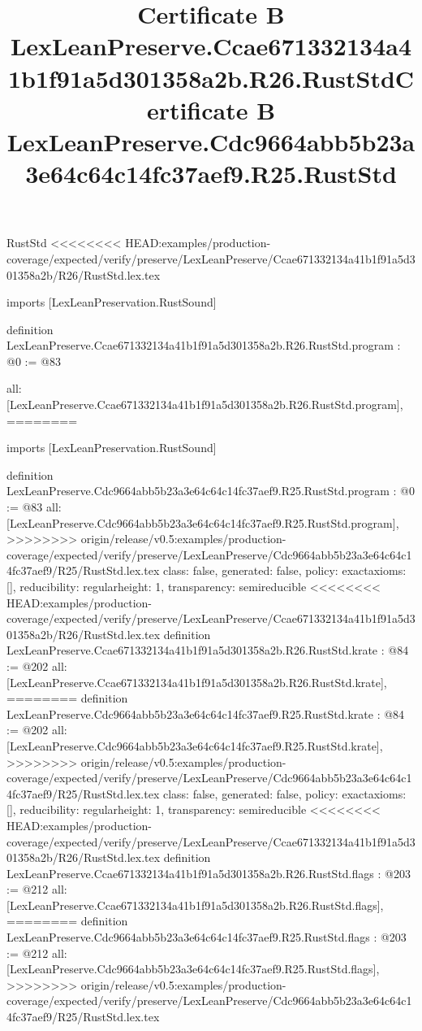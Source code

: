\begin{lexlean}{RustStd}
<<<<<<<< HEAD:examples/production-coverage/expected/verify/preserve/LexLeanPreserve/Ccae671332134a41b1f91a5d301358a2b/R26/RustStd.lex.tex
\title{Certificate B LexLeanPreserve.Ccae671332134a41b1f91a5d301358a2b.R26.RustStd}
\begin{coremodule}
imports [LexLeanPreservation.RustSound]

definition LexLeanPreserve.Ccae671332134a41b1f91a5d301358a2b.R26.RustStd.program : @0 := @83 {
  all: [LexLeanPreserve.Ccae671332134a41b1f91a5d301358a2b.R26.RustStd.program],
========
\title{Certificate B LexLeanPreserve.Cdc9664abb5b23a3e64c64c14fc37aef9.R25.RustStd}
\begin{coremodule}
imports [LexLeanPreservation.RustSound]

definition LexLeanPreserve.Cdc9664abb5b23a3e64c64c14fc37aef9.R25.RustStd.program : @0 := @83 {
  all: [LexLeanPreserve.Cdc9664abb5b23a3e64c64c14fc37aef9.R25.RustStd.program],
>>>>>>>> origin/release/v0.5:examples/production-coverage/expected/verify/preserve/LexLeanPreserve/Cdc9664abb5b23a3e64c64c14fc37aef9/R25/RustStd.lex.tex
  class: false,
  generated: false,
  policy: exact{axioms: []},
  reducibility: regular{height: 1},
  transparency: semireducible
}
<<<<<<<< HEAD:examples/production-coverage/expected/verify/preserve/LexLeanPreserve/Ccae671332134a41b1f91a5d301358a2b/R26/RustStd.lex.tex
definition LexLeanPreserve.Ccae671332134a41b1f91a5d301358a2b.R26.RustStd.krate : @84 := @202 {
  all: [LexLeanPreserve.Ccae671332134a41b1f91a5d301358a2b.R26.RustStd.krate],
========
definition LexLeanPreserve.Cdc9664abb5b23a3e64c64c14fc37aef9.R25.RustStd.krate : @84 := @202 {
  all: [LexLeanPreserve.Cdc9664abb5b23a3e64c64c14fc37aef9.R25.RustStd.krate],
>>>>>>>> origin/release/v0.5:examples/production-coverage/expected/verify/preserve/LexLeanPreserve/Cdc9664abb5b23a3e64c64c14fc37aef9/R25/RustStd.lex.tex
  class: false,
  generated: false,
  policy: exact{axioms: []},
  reducibility: regular{height: 1},
  transparency: semireducible
}
<<<<<<<< HEAD:examples/production-coverage/expected/verify/preserve/LexLeanPreserve/Ccae671332134a41b1f91a5d301358a2b/R26/RustStd.lex.tex
definition LexLeanPreserve.Ccae671332134a41b1f91a5d301358a2b.R26.RustStd.flags : @203 := @212 {
  all: [LexLeanPreserve.Ccae671332134a41b1f91a5d301358a2b.R26.RustStd.flags],
========
definition LexLeanPreserve.Cdc9664abb5b23a3e64c64c14fc37aef9.R25.RustStd.flags : @203 := @212 {
  all: [LexLeanPreserve.Cdc9664abb5b23a3e64c64c14fc37aef9.R25.RustStd.flags],
>>>>>>>> origin/release/v0.5:examples/production-coverage/expected/verify/preserve/LexLeanPreserve/Cdc9664abb5b23a3e64c64c14fc37aef9/R25/RustStd.lex.tex
}}}
\end{coremodule}}
\end{coremodule}
\end{lexlean}
